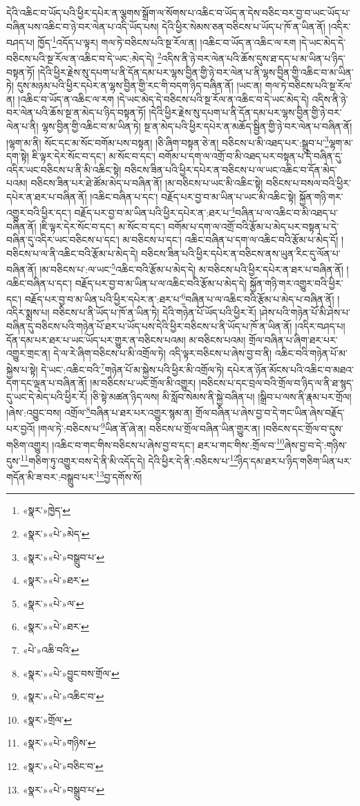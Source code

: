 དེའི་འཆིང་བ་ཡོད་པའི་ཕྱིར་དཔེར་ན་ལྕགས་སྒྲོག་ལ་སོགས་པ་འཆིང་བ་ཡོད་ན་དེས་བཅིང་བར་བྱ་བ་ཡང་ཡོད་པ་བཞིན་པས་འཆིང་བ་ཉེ་བར་ལེན་པ་འདི་ཡོད་པས། དེའི་ཕྱིར་སེམས་ཅན་བཅིངས་པ་ཡོད་པ་ཁོ་ན་ཡིན་ནོ། །འདིར་བཤད་པ། ཁྱོད་\footnote{«སྣར་»ཁྱེད་}འདོད་པ་ལྟར། གལ་ཏེ་བཅིངས་པའི་སྔ་རོལ་ན། །འཆིང་བ་ཡོད་ན་འཆིང་ལ་རག །དེ་ཡང་མེད་དེ་བཅིངས་པའི་སྔ་རོལ་ན་འཆིང་བ་དེ་ཡང་:མེད་དེ། \footnote{«སྣར་»«པེ་»མེད་}འདིས་ནི་ཉེ་བར་ལེན་པའི་ཆོས་དུས་ཐ་དད་པ་མ་ཡིན་པ་ཉིད་བསྟན་ཏོ། །དེའི་ཕྱིར་རྗེས་སུ་དཔག་པ་ནི་དོན་དམ་པར་ལྷས་བྱིན་གྱི་ཉེ་བར་ལེན་པ་ནི་ལྷས་བྱིན་གྱི་འཆིང་བ་མ་ཡིན་ཏེ། དུས་མཉམ་པའི་ཕྱིར་དཔེར་ན་ལྷས་བྱིན་གྱི་རང་གི་བདག་ཉིད་བཞིན་ནོ། །ཡང་ན། གལ་ཏེ་བཅིངས་པའི་སྔ་རོལ་ན། །འཆིང་བ་ཡོད་ན་འཆིང་ལ་རག །དེ་ཡང་མེད་དེ་བཅིངས་པའི་སྔ་རོལ་ན་འཆིང་བ་དེ་ཡང་མེད་དེ། འདིས་ནི་ཉེ་བར་ལེན་པའི་ཆོས་སྔ་ན་མེད་པ་ཉིད་བསྟན་ཏོ། །དེའི་ཕྱིར་རྗེས་སུ་དཔག་པ་ནི་དོན་དམ་པར་ལྷས་བྱིན་གྱི་ཉེ་བར་ལེན་པ་ནི། ལྷས་བྱིན་གྱི་འཆིང་བ་མ་ཡིན་ཏེ། སྔ་ན་མེད་པའི་ཕྱིར་དཔེར་ན་མཆོད་སྦྱིན་གྱི་ཉེ་བར་ལེན་པ་བཞིན་ནོ། །ལྷག་མ་ནི། སོང་དང་མ་སོང་བགོམ་པས་བསྟན། །ཅི་ཞིག་བསྟན་ཅེ་ན། བཅིངས་པ་མི་འཐད་པར་:སྒྲུབ་པ་\footnote{«སྣར་»«པེ་»བསྒྲུབ་པ་}ལྷག་མ་དག་སྟེ། ཇི་ལྟར་དེར་སོང་བ་དང་། མ་སོང་བ་དང་། བགོམ་པ་དག་ལ་འགྲོ་བ་མི་འཐད་པར་བསྟན་པ་དེ་བཞིན་དུ་འདིར་ཡང་བཅིངས་པ་ནི་མི་འཆིང་སྟེ། བཅིངས་ཟིན་པའི་ཕྱིར་དཔེར་ན་བཅིངས་པ་ལ་ཡང་འཆིང་བ་དོན་མེད་པའམ། བཅིངས་ཟིན་པར་ཐེ་ཚོམ་མེད་པ་བཞིན་ནོ། །མ་བཅིངས་པ་ཡང་མི་འཆིང་སྟེ། བཅིངས་པ་བསལ་བའི་ཕྱིར་དཔེར་ན་ཐར་པ་བཞིན་ནོ། །འཆིང་བཞིན་པ་དང་། བརྗོད་པར་བྱ་བ་མ་ཡིན་པ་ཡང་མི་འཆིང་སྟེ། སྐྱོན་གཉི་གར་འགྱུར་བའི་ཕྱིར་དང་། བརྗོད་པར་བྱ་བ་མ་ཡིན་པའི་ཕྱིར་དཔེར་ན་:ཐར་པ་\footnote{«སྣར་»«པེ་»ཐར་}བཞིན་པ་ལ་འཆིང་བ་མི་འཐད་པ་བཞིན་ནོ། །ཇི་ལྟར་དེར་སོང་བ་དང་། མ་སོང་བ་དང་། བགོམ་པ་དག་ལ་འགྲོ་བའི་རྩོམ་པ་མེད་པར་བསྟན་པ་དེ་བཞིན་དུ་འདིར་ཡང་བཅིངས་པ་དང་། མ་བཅིངས་པ་དང་། འཆིང་བཞིན་པ་དག་ལ་འཆིང་བའི་རྩོམ་པ་མེད་དོ། །བཅིངས་པ་ལ་ནི་འཆིང་བའི་རྩོམ་པ་མེད་དེ། བཅིངས་ཟིན་པའི་ཕྱིར་དཔེར་ན་བཅིངས་ནས་ཡུན་རིང་དུ་ལོན་པ་བཞིན་ནོ། །མ་བཅིངས་པ་:ལ་ཡང་\footnote{«སྣར་»«པེ་»ལ་}འཆིང་བའི་རྩོམ་པ་མེད་དེ། མ་བཅིངས་པའི་ཕྱིར་དཔེར་ན་ཐར་པ་བཞིན་ནོ། །འཆིང་བཞིན་པ་དང་། བརྗོད་པར་བྱ་བ་མ་ཡིན་པ་ལ་འཆིང་བའི་རྩོམ་པ་མེད་དེ། སྐྱོན་གཉི་གར་འགྱུར་བའི་ཕྱིར་དང་། བརྗོད་པར་བྱ་བ་མ་ཡིན་པའི་ཕྱིར་དཔེར་ན་:ཐར་པ་\footnote{«སྣར་»«པེ་»ཐར་}བཞིན་པ་ལ་འཆིང་བའི་རྩོམ་པ་མེད་པ་བཞིན་ནོ། །འདིར་སྨྲས་པ། བཅིངས་པ་ནི་ཡོད་པ་ཁོ་ན་ཡིན་ཏེ། དེའི་གཉེན་པོ་ཡོད་པའི་ཕྱིར་རོ། །ཤེས་པའི་གཉེན་པོ་མི་ཤེས་པ་བཞིན་དུ་བཅིངས་པའི་གཉེན་པོ་ཐར་པ་ཡོད་པས་དེའི་ཕྱིར་བཅིངས་པ་ནི་ཡོད་པ་ཁོ་ན་ཡིན་ནོ། །འདིར་བཤད་པ། དོན་དམ་པར་ཐར་པ་ཡང་ཡོད་པར་གྱུར་ན་བཅིངས་པའམ། མ་བཅིངས་པའམ། གྲོལ་བཞིན་པ་ཞིག་ཐར་པར་འགྱུར་གྲང་ན། དེ་ལ་རེ་ཞིག་བཅིངས་པ་མི་འགྲོལ་ཏེ། འདི་ལྟར་བཅིངས་པ་ཞེས་བྱ་བ་ནི། འཆིང་བའི་གཉེན་པོ་མ་སྐྱེས་པ་སྟེ། དེ་ཡང་:འཆིང་བའི་\footnote{«པེ་»འཆི་བའི་}གཉེན་པོ་མ་སྐྱེས་པའི་ཕྱིར་མི་འགྲོལ་ཏེ། དཔེར་ན་ཉོན་མོངས་པའི་འཆིང་བ་མཐའ་དག་དང་ལྡན་པ་བཞིན་ནོ། །མ་བཅིངས་པ་ཡང་གྲོལ་མི་འགྱུར། །བཅིངས་པ་དང་བྲལ་བའི་གྲོལ་བ་ཉིད་ལ་ནི་ཐ་སྙད་དུ་ཡང་དེ་མེད་པའི་ཕྱིར་རོ། །ཅི་སྟེ་མཚན་ཉིད་ལས། མི་སློབ་སེམས་ནི་སྐྱེ་བཞིན་པ། །སྒྲིབ་པ་ལས་ནི་རྣམ་པར་གྲོལ། །ཞེས་:འབྱུང་བས། འགྲོལ་\footnote{«སྣར་»«པེ་»བྱུང་བས་གྲོལ་}བཞིན་པ་ཐར་པར་འགྱུར་སྙམ་ན། གྲོལ་བཞིན་པ་ཞེས་བྱ་བ་དེ་གང་ཡིན་ཞེས་བརྗོད་པར་བྱའོ། །གལ་ཏེ་:བཅིངས་པ་\footnote{«སྣར་»«པེ་»འཆིང་བ་}ཡིན་ནོ་ཞེ་ན། བཅིངས་པ་གྲོལ་བཞིན་ཡིན་གྱུར་ན། །བཅིངས་དང་གྲོལ་བ་དུས་གཅིག་འགྱུར། །འཆིང་བ་གང་གིས་བཅིངས་པ་ཞེས་བྱ་བ་དང་། ཐར་པ་གང་གིས་:གྲོལ་བ་\footnote{«སྣར་»གྲོལ་}ཞེས་བྱ་བ་དེ་:གཉིས་དུས་\footnote{«སྣར་»«པེ་»གཉིས་}གཅིག་ཏུ་འགྱུར་བས་དེ་ནི་མི་འདོད་དེ། དེའི་ཕྱིར་དེ་ནི་:བཅིངས་པ་\footnote{«སྣར་»«པེ་»བཅིང་བ་}ཉིད་དམ་ཐར་པ་ཉིད་གཅིག་ཡིན་པར་གདོན་མི་ཟ་བར་:བསྒྲུབ་པར་\footnote{«སྣར་»«པེ་»བསྒྲུབ་པ་}བྱ་དགོས་སོ། 